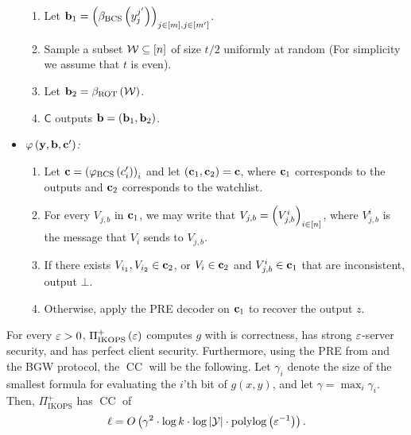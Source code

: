 \documentclass{llncs}
\newcommand{\ROT}{\operatorname{ROT}}
\newcommand{\stb}{\operatorname{BCS}}
\newcommand{\Y}{\mathcal{Y}}
\newcommand{\W}{\mathcal{W}}
\renewcommand{\b}{\myvec{b}}
\renewcommand{\c}{\myvec{c}}
\newcommand{\y}{\myvec{y}}
\newcommand{\clnt}{\beta}
\newcommand{\local}{\varphi}
\newcommand{\CC}{\operatorname{CC}}
\newcommand{\IKOPS}{\operatorname{IKOPS}}
\newcommand{\Cc}{\mathsf{C}}
\begin{document}
\begin{protocol}[$\Pi^+_{\IKOPS}\of{\eps}$]
\begin{itemize}
\begin{enumerate}
        \item Let $\b_1=\vect{\clnt_{\stb}\of{y_j^{j'}}}_{j\in[m],j\in[m']}$.
        
        \item Sample a subset $\W\su[n]$ of size $t/2$ uniformly at random (For simplicity we assume that $t$ is even).
        
        \item Let $\b_2=\clnt_{\ROT}\of{\W}$.
        
        \item $\Cc$ outputs $\b=(\b_1,\b_2)$.
    \end{enumerate}
    
    \item$\local\of{\y,\b,\c'}$\emph{:}
    \begin{enumerate}
    	\item Let $\c=\vect{\local_{\stb}\of{c'_i}}_{i}$ and let $(\c_1,\c_2)=\c$, where $\c_1$ corresponds to the outputs and $\c_2$ corresponds to the watchlist.
        
        \item For every $V_{j,b}$ in $\c_1$, we may write \wlg that $V_{j,b}=\left ( V_{j,b}^i \right )_{i\in[n]}$, where $V_{j,b}^i$ is the message that $V_{i}$ sends to $V_{j,b}$.
        
        \item If there exists $V_{i_1},V_{i_2}\in\c_2$, or $V_i\in\c_2$ and $V_{j,b}^i\in\c_1$ that are inconsistent, output $\bot$.
        
        \item Otherwise, apply the PRE decoder on $\c_1$ to recover the output $z$.
    \end{enumerate}
\end{itemize}
\end{protocol}

\begin{lemma}
For every $\varepsilon>0$, $\Pi_{\IKOPS}^+\of{\eps}$ computes $g$ with is correctness, has strong $\varepsilon$-server security, and has perfect client security. Furthermore, using the PRE from \cite{IK02,AIK04} and the BGW protocol, the $\CC$ will be the following. Let $\gamma_i$ denote the size of the smallest formula for evaluating the $i$'th bit of $g(x,y)$, and let $\gamma=\max_{i} \gamma_i$.	Then, $\Pi^+_{\IKOPS}$ has $\CC$ of \changed{$\ell=\log\of{k}\cdot\tilde{O}\of{\log\of{|\Y|}\cdot\left(\log\of{{\eps^{-1}}}+\alpha\right)^2}+\polylog(\eps^{-1})$.}
    $$\ell=O\of{\gamma^2\cdot\log k\cdot\log|\Y|\cdot\polylog\of{\eps^{-1}}}.$$
\end{lemma}
\end{document}
